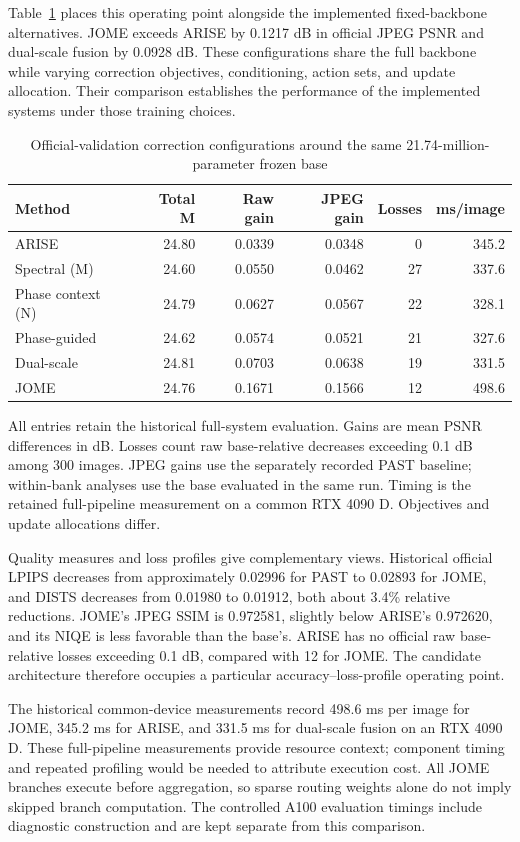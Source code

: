 \documentclass[12pt]{article}
\newcommand{\tabnote}[1]{\par\vspace{5pt}\noindent #1}
\begin{document}
Table~\ref{tab:fixed} places this operating point alongside the implemented fixed-backbone alternatives. JOME exceeds ARISE by 0.1217 dB in official JPEG PSNR and dual-scale fusion by 0.0928 dB. These configurations share the full backbone while varying correction objectives, conditioning, action sets, and update allocation. Their comparison establishes the performance of the implemented systems under those training choices.
\begin{table}[t]
\caption{Official-validation correction configurations around the same 21.74-million-parameter frozen base}
\label{tab:fixed}
\begin{tabularx}{\linewidth}{@{}Xrrrrr@{}}
\toprule
Method & Total M & Raw gain & JPEG gain & Losses & ms/image\\
\midrule
ARISE & 24.80 & 0.0339 & 0.0348 & 0 & 345.2 \\
Spectral (M) & 24.60 & 0.0550 & 0.0462 & 27 & 337.6 \\
Phase context (N) & 24.79 & 0.0627 & 0.0567 & 22 & 328.1 \\
Phase-guided & 24.62 & 0.0574 & 0.0521 & 21 & 327.6 \\
Dual-scale & 24.81 & 0.0703 & 0.0638 & 19 & 331.5 \\
JOME & 24.76 & 0.1671 & 0.1566 & 12 & 498.6 \\
\bottomrule
\end{tabularx}
\tabnote{All entries retain the historical full-system evaluation. Gains are mean PSNR differences in dB. Losses count raw base-relative decreases exceeding 0.1 dB among 300 images. JPEG gains use the separately recorded PAST baseline; within-bank analyses use the base evaluated in the same run. Timing is the retained full-pipeline measurement on a common RTX 4090 D. Objectives and update allocations differ.}
\end{table}


Quality measures and loss profiles give complementary views. Historical official LPIPS decreases from approximately 0.02996 for PAST to 0.02893 for JOME, and DISTS decreases from 0.01980 to 0.01912, both about 3.4\% relative reductions. JOME's JPEG SSIM is 0.972581, slightly below ARISE's 0.972620, and its NIQE is less favorable than the base's. ARISE has no official raw base-relative losses exceeding 0.1 dB, compared with 12 for JOME. The candidate architecture therefore occupies a particular accuracy--loss-profile operating point.

The historical common-device measurements record 498.6 ms per image for JOME, 345.2 ms for ARISE, and 331.5 ms for dual-scale fusion on an RTX 4090 D. These full-pipeline measurements provide resource context; component timing and repeated profiling would be needed to attribute execution cost. All JOME branches execute before aggregation, so sparse routing weights alone do not imply skipped branch computation. The controlled A100 evaluation timings include diagnostic construction and are kept separate from this comparison.
\end{document}

